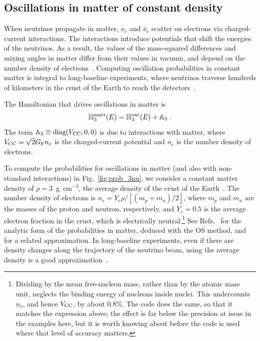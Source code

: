 \documentclass[final,5p,times,twocolumn]{elsarticle}
\newcommand{\fig}{Fig.}
\providecommand{\Ref}{} %
\newcommand{\Refs}{Refs.}
\newcommand{\figu}[1]{\fig~\ref{fig:#1}}
\providecommand{\DIFaddtex}[1]{{\protect\color{blue} \sf #1}} %
\providecommand{\DIFaddbegin}{} %
\providecommand{\DIFaddend}{} %
\providecommand{\DIFadd}[1]{\DIFaddtex{#1}} %
\begin{document}
\subsection{Oscillations in matter of constant density}
\label{section:prob_3nu_matter}

When neutrinos propagate in matter, $\nu_e$ and $\bar{\nu}_e$ scatter on electrons via charged-current interactions.  The interactions introduce potentials that shift the energies of the neutrinos.  As a result, the values of the mass-squared differences and mixing angles in matter differ from their values in vacuum, and depend on the number density of electrons\ \cite{Wolfenstein:1977ue, Mikheev:1986gs, Bethe:1986ej, Parke:1986jy, Rosen:1986jy}.  Computing oscillation probabilities in constant matter is integral to long-baseline experiments, where neutrinos traverse hundreds of kilometers in the crust of the Earth to reach the detectors\ \cite{Feldman:2013vca, Diwan:2016gmz}.

The Hamiltonian that drives oscillations in matter is
\begin{equation}
 \label{equ:h3_matt}
 \mathbb{H}_3^{\rm matt}(E)
 = 
 \mathbb{H}_3^{\rm vac}(E) + \mathbb{A}_3 \;.
\end{equation}
The term $\mathbb{A}_3 \equiv {\rm diag}(V_{\rm CC}, 0 ,0)$ is due to interactions with matter, where $V_{\rm CC} = \sqrt{2} G_{\rm F} n_e$ is the charged-current potential and $n_e$ is the number density of electrons.

To compute the probabilities for oscillations in matter (and also with non-standard interactions) in \figu{prob_3nu}, we consider a constant matter density of $\rho = 3$~g~cm$^{-3}$, the average density of the crust of the Earth\ \cite{Dziewonski:1981xy}.  The number density of electrons is $n_e = Y_e \rho / [(m_p + m_n)/2]$, where $m_p$ and $m_n$ are the masses of the proton and neutron, respectively, and $Y_e = 0.5$ is the average electron fraction in the crust, which is electrically neutral.\DIFaddbegin \footnote{\DIFadd{Dividing by the mean free-nucleon mass, rather than by the atomic mass unit, neglects the binding energy of nucleons inside nuclei.  This undercounts $n_e$, and hence $V_{\rm CC}$, by about $0.8\%$.  The code does the same, so that it matches the expression above; the effect is far below the precision at issue in the examples here, but it is worth knowing about before the code is used where that level of accuracy matters.}}  \DIFaddend See \Refs\ \cite{Ohlsson:1999xb, Ohlsson:1999um} for the analytic form of the probabilities in matter, deduced with the OS method, and \Ref\ \cite{Freund:2001pn} for a related approximation.  In long-baseline experiments, even if there are density changes along the trajectory of the neutrino beam, using the average density is a good approximation\ \cite{Petcov:1998su, Freund:1999gy}.  
\end{document}
